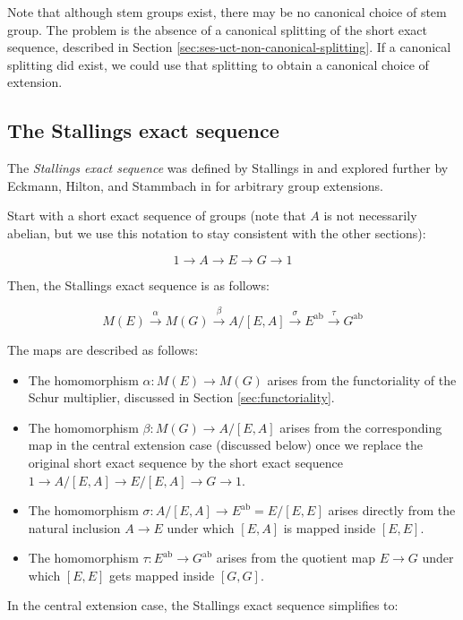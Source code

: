 \documentclass{ucetd}
\begin{document}
Note that although stem groups exist, there may be no canonical choice
of stem group. The problem is the absence of a canonical splitting of
the short exact sequence, described in Section
\ref{sec:ses-uct-non-canonical-splitting}. If a canonical splitting
did exist, we could use that splitting to obtain a canonical choice of
extension.

\subsection{The Stallings exact sequence}

The {\em Stallings exact sequence} was defined by Stallings in
\cite{Stallings} and explored further by Eckmann, Hilton, and
Stammbach in \cite{EckmannHiltonStammbach} for arbitrary group
extensions.

Start with a short exact sequence of groups (note that $A$ is not
necessarily abelian, but we use this notation to stay consistent with
the other sections):

$$1 \to A \to E \to G \to 1$$

Then, the Stallings exact sequence is as follows:

$$M(E) \stackrel{\alpha}{\to} M(G) \stackrel{\beta}{\to} A/[E,A] \stackrel{\sigma}{\to} E^{\operatorname{ab}} \stackrel{\tau}{\to} G^{\operatorname{ab}}$$

The maps are described as follows:

\begin{itemize}
\item The homomorphism $\alpha:M(E) \to M(G)$ arises from the
  functoriality of the Schur multiplier, discussed in Section
  \ref{sec:functoriality}.
\item The homomorphism $\beta:M(G) \to A/[E,A]$ arises from the
  corresponding map in the central extension case (discussed below)
  once we replace the original short exact sequence by the short exact
  sequence $1 \to A/[E,A] \to E/[E,A] \to G \to 1$.
\item The homomorphism $\sigma:A/[E,A] \to E^{\operatorname{ab}} =
  E/[E,E]$ arises directly from the natural inclusion $A \to E$ under
  which $[E,A]$ is mapped inside $[E,E]$.
\item The homomorphism $\tau:E^{\operatorname{ab}} \to
  G^{\operatorname{ab}}$ arises from the quotient map $E \to G$ under
  which $[E,E]$ gets mapped inside $[G,G]$.
\end{itemize}

In the central extension case, the Stallings exact sequence simplifies to:
\end{document}
